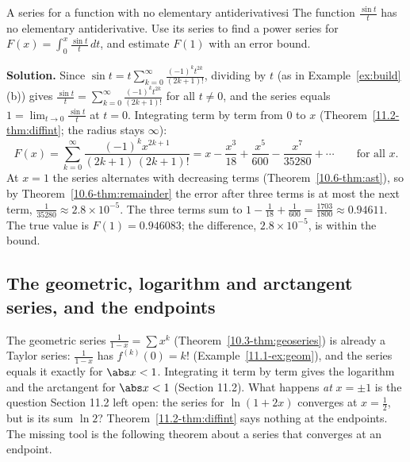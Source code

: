 \documentclass[11pt]{article}
\begin{document}
\begin{exmp}{A series for a function with no elementary antiderivative}{si}
The function $\frac{\sin t}t$ has no elementary antiderivative. Use its series to find a power series for $F(x)=\displaystyle\int_0^x\frac{\sin t}t\,dt$, and estimate $F(1)$ with an error bound.

\textbf{Solution.} Since $\sin t=t\sum_{k=0}^\infty\frac{(-1)^kt^{2k}}{(2k+1)!}$, dividing by $t$ (as in Example~\ref{ex:build}(b)) gives $\frac{\sin t}t=\sum_{k=0}^\infty\frac{(-1)^kt^{2k}}{(2k+1)!}$ for all $t\ne0$, and the series equals $1=\lim_{t\to0}\frac{\sin t}t$ at $t=0$. Integrating term by term from $0$ to $x$ (Theorem~\ref{11.2-thm:diffint}; the radius stays $\infty$):
\[
F(x)=\sum_{k=0}^\infty\frac{(-1)^kx^{2k+1}}{(2k+1)\,(2k+1)!}=x-\frac{x^3}{18}+\frac{x^5}{600}-\frac{x^7}{35280}+\cdots\qquad\text{for all }x.
\]
At $x=1$ the series alternates with decreasing terms (Theorem~\ref{10.6-thm:ast}), so by Theorem~\ref{10.6-thm:remainder} the error after three terms is at most the next term, $\frac1{35280}\approx2.8\times10^{-5}$. The three terms sum to $1-\frac1{18}+\frac1{600}=\frac{1703}{1800}\approx0.94611$. The true value is $F(1)=0.946083$; the difference, $2.8\times10^{-5}$, is within the bound.
\end{exmp}

\subsection*{The geometric, logarithm and arctangent series, and the endpoints}

The geometric series $\frac1{1-x}=\sum x^k$ (Theorem~\ref{10.3-thm:geoseries}) is already a Taylor series: $\frac1{1-x}$ has $f^{(k)}(0)=k!$ (Example~\ref{11.1-ex:geom}), and the series equals it exactly for $\abs x<1$. Integrating it term by term gives the logarithm and the arctangent for $\abs x<1$ (Section 11.2). What happens \emph{at} $x=\pm1$ is the question Section 11.2 left open: the series for $\ln(1+2x)$ converges at $x=\frac12$, but is its sum $\ln2$? Theorem~\ref{11.2-thm:diffint} says nothing at the endpoints. The missing tool is the following theorem about a series that converges at an endpoint.
\end{document}
